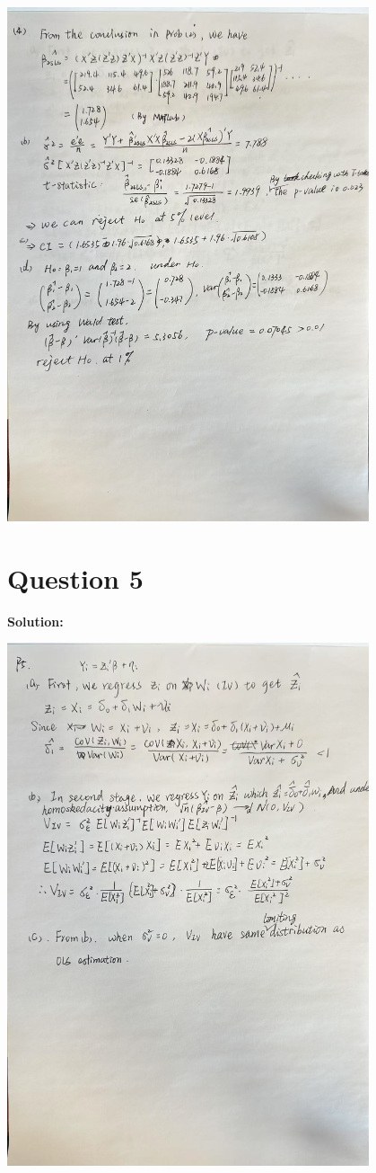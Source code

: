 \documentclass[12pt, oneside]{article}
\begin{document}
\begin{center}
    
    \includegraphics[width=0.8\textwidth]{Figure/P4.jpg}

\end{center}
\section{Question 5}
\textbf{Solution:}

\begin{center}
    
    \includegraphics[width=0.8\textwidth]{Figure/P5.jpg}
\end{center}
\end{document}
